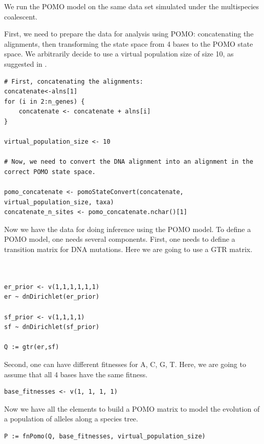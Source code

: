 \documentclass[11pt]{article}
\begin{document}
We run the POMO model on the same data set simulated under the multispecies coalescent.
 {\begin{framed}
 First, we need to prepare the data for analysis using POMO: concatenating the alignments, then transforming the state space from 4 bases to the POMO state space.
 We arbitrarily decide to use a virtual population size of size 10, as suggested in \citet{DeMaio2013}.
 {\tt \begin{snugshade*}
\begin{lstlisting}
# First, concatenating the alignments:
concatenate<-alns[1]
for (i in 2:n_genes) {
	concatenate <- concatenate + alns[i]
}

virtual_population_size <- 10

# Now, we need to convert the DNA alignment into an alignment in the correct POMO state space.

pomo_concatenate <- pomoStateConvert(concatenate, virtual_population_size, taxa)
concatenate_n_sites <- pomo_concatenate.nchar()[1]
\end{lstlisting}
\end{snugshade*}}
Now we have the data for doing inference using the POMO model.
To define a POMO model, one needs several components.
First, one needs to define a transition matrix for DNA mutations.
Here we are going to use a GTR matrix. 

 {\tt \begin{snugshade*}
\begin{lstlisting}


er_prior <- v(1,1,1,1,1,1)
er ~ dnDirichlet(er_prior)

sf_prior <- v(1,1,1,1)
sf ~ dnDirichlet(sf_prior)

Q := gtr(er,sf) 
\end{lstlisting}
\end{snugshade*}}

Second, one can have different fitnesses for A, C, G, T. 
Here, we are going to assume that all 4 bases have the same fitness.

 {\tt \begin{snugshade*}
\begin{lstlisting}
base_fitnesses <- v(1, 1, 1, 1)
\end{lstlisting}
\end{snugshade*}}
Now we have all the elements to build a POMO matrix to model the evolution of a population of alleles along a species tree.
 {\tt \begin{snugshade*}
\begin{lstlisting}
P := fnPomo(Q, base_fitnesses, virtual_population_size)
\end{lstlisting}
\end{snugshade*}}


\end{framed}}
\end{document}
